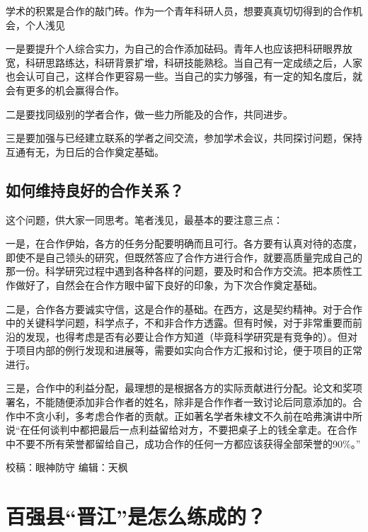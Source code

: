 \documentclass[
]{book}
\begin{document}
学术的积累是合作的敲门砖。作为一个青年科研人员，想要真真切切得到的合作机会，个人浅见

一是要提升个人综合实力，为自己的合作添加砝码。青年人也应该把科研眼界放宽，科研思路练达，科研背景扩增，科研技能熟稔。当自己有一定成绩之后，人家也会认可自己，这样合作更容易一些。当自己的实力够强，有一定的知名度后，就会有更多的机会赢得合作。

二是要找同级别的学者合作，做一些力所能及的合作，共同进步。

三是要加强与已经建立联系的学者之间交流，参加学术会议，共同探讨问题，保持互通有无，为日后的合作奠定基础。

\hypertarget{ux5982ux4f55ux7ef4ux6301ux826fux597dux7684ux5408ux4f5cux5173ux7cfb}{%
\subsection{如何维持良好的合作关系？}\label{ux5982ux4f55ux7ef4ux6301ux826fux597dux7684ux5408ux4f5cux5173ux7cfb}}

这个问题，供大家一同思考。笔者浅见，最基本的要注意三点：

一是，在合作伊始，各方的任务分配要明确而且可行。各方要有认真对待的态度，即使不是自己领头的研究，但既然答应了合作方进行合作，就要高质量完成自己的那一份。科学研究过程中遇到各种各样的问题，要及时和合作方交流。把本质性工作做好了，自然会在合作方眼中留下良好的印象，为下次合作奠定基础。

二是，合作各方要诚实守信，这是合作的基础。在西方，这是契约精神。对于合作中的关键科学问题，科学点子，不和非合作方透露。但有时候，对于非常重要而前沿的发现，也得考虑是否有必要让合作方知道（毕竟科学研究是有竞争的）。但对于项目内部的例行发现和进展等，需要如实向合作方汇报和讨论，便于项目的正常进行。

三是，合作中的利益分配，最理想的是根据各方的实际贡献进行分配。论文和奖项署名，不能随便添加非合作者的姓名，除非是合作作者一致讨论后同意添加的。合作中不贪小利，多考虑合作者的贡献。正如著名学者朱棣文不久前在哈弗演讲中所说``在任何谈判中都把最后一点利益留给对方，不要把桌子上的钱全拿走。在合作中不要不所有荣誉都留给自己，成功合作的任何一方都应该获得全部荣誉的90\%。''

校稿：眼神防守
编辑：天枫

\hypertarget{ux767eux5f3aux53bfux664bux6c5fux662fux600eux4e48ux7ec3ux6210ux7684}{%
\section{百强县``晋江''是怎么练成的？}\label{ux767eux5f3aux53bfux664bux6c5fux662fux600eux4e48ux7ec3ux6210ux7684}}
\end{document}

